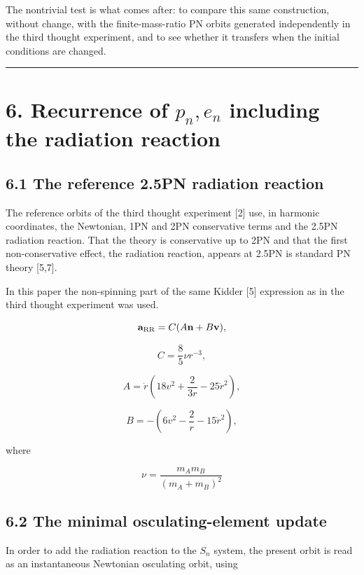 \documentclass[
  a4paper,
]{article}
\begin{document}
The nontrivial test is what comes after: to compare this same
construction, without change, with the finite-mass-ratio PN orbits
generated independently in the third thought experiment, and to see
whether it transfers when the initial conditions are changed.

\begin{center}\rule{0.5\linewidth}{0.5pt}\end{center}

\section{\texorpdfstring{6. Recurrence of \(p_n,e_n\) including the
radiation
reaction}{6. Recurrence of p\_n,e\_n including the radiation reaction}}\label{recurrence-of-p_ne_n-including-the-radiation-reaction}

\subsection{6.1 The reference 2.5PN radiation
reaction}\label{the-reference-2.5pn-radiation-reaction}

The reference orbits of the third thought experiment {[}2{]} use, in
harmonic coordinates, the Newtonian, 1PN and 2PN conservative terms and
the 2.5PN radiation reaction. That the theory is conservative up to 2PN
and that the first non-conservative effect, the radiation reaction,
appears at 2.5PN is standard PN theory {[}5,7{]}.

In this paper the non-spinning part of the same Kidder {[}5{]}
expression as in the third thought experiment was used.

\[
\mathbf a_{\rm RR}
=C(A\mathbf n+B\mathbf v),
\]

\[
C=\frac85\nu r^{-3},
\]

\[
A
=\dot r
\left(
18v^2+\frac{2}{3r}-25\dot r^2
\right),
\]

\[
B
=-\left(
6v^2-\frac2r-15\dot r^2
\right),
\]

where

\[
\nu=\frac{m_Am_B}{(m_A+m_B)^2}
\]

\subsection{6.2 The minimal osculating-element
update}\label{the-minimal-osculating-element-update}

In order to add the radiation reaction to the \(S_n\) system, the
present orbit is read as an instantaneous Newtonian osculating orbit,
using
\end{document}
